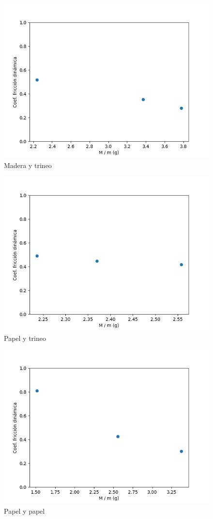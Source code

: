 \documentclass[12pt,a4]{article}
\begin{document}
\begin{figure}[H]
    \centering
    \includegraphics[width=0.6\linewidth]{ud_PisoMadera.png}
    \caption{Madera y trineo}
    \label{fig:mu_d piso trineo}
\end{figure}

\begin{figure}[H]
    \centering
    \includegraphics[width=0.6\linewidth]{ud_PisoPapel.png}
    \caption{Papel y trineo}
    \label{fig:mu_d piso hoja}
\end{figure}

\begin{figure}[H]
    \centering
    \includegraphics[width=0.6\linewidth]{ud_PapelPapel.png}
    \caption{Papel y papel}
    \label{fig:mu_d papel papel}
\end{figure}
\end{document}
